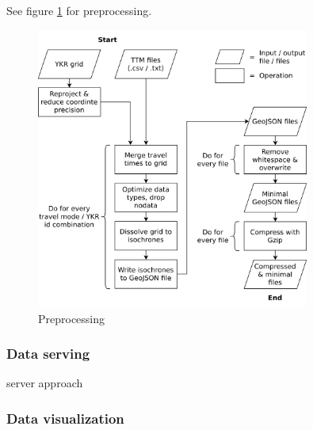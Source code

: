 



See figure \ref{fig:preprocessing} for preprocessing.

\begin{figure}[H]
	\centering
	\includegraphics[width=0.8\textwidth]{visual/figures/diagrams/preprocessing.png}
	\caption{Preprocessing}
	\label{fig:preprocessing}
\end{figure}

\subsubsection{Data serving}
server approach





\subsubsection{Data visualization}

